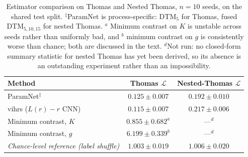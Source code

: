 \documentclass[11pt,a4paper]{article}
\begin{document}
\begin{table}[tbp]
\centering
\small
\begin{tabular}{lcc}
\toprule
Method & Thomas $\mathcal{L}$ & Nested-Thomas $\mathcal{L}$ \\
\midrule
ParamNet$^{\ddagger}$    & $0.125 \pm 0.007$ & $0.192 \pm 0.010$ \\
vihrs ($L(r)-r$ CNN)     & $0.115 \pm 0.007$ & $0.217 \pm 0.006$ \\
Minimum contrast, $K$   & $0.855 \pm 0.682^{a}$ & ---$^{d}$ \\
Minimum contrast, $g$   & $6.199 \pm 0.339^{b}$ & ---$^{d}$ \\
\midrule
\emph{Chance-level reference (label shuffle)} & \emph{$1.003 \pm 0.019$} & \emph{$1.006 \pm 0.020$} \\
\bottomrule
\end{tabular}
\caption{Estimator comparison on Thomas and Nested Thomas, $n=10$ seeds, on the
shared test split. $^{\ddagger}$ParamNet is process-specific: DTM$_5$ for
Thomas, fused DTM$_{5,10,15}$ for nested Thomas. $^a$ Minimum contrast on $K$ is
unstable across seeds rather than uniformly bad, and $^b$ minimum contrast on
$g$ is consistently worse than chance; both are discussed in the text.
$^{d}$Not run: no closed-form summary statistic for nested Thomas has yet been
derived, so its absence is an outstanding experiment rather than an
impossibility.}
\label{tab:classical-comparison}
\end{table}
\end{document}
